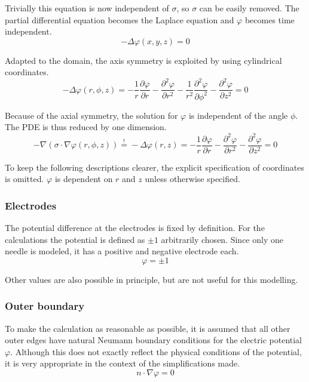\documentclass[parskip=half, titlepage=yes, 12pt, BCOR=12mm, DIV=calc]{scrartcl}
\begin{document}
Trivially this equation is now independent of $\sigma$, so $\sigma$ can be easily removed. The partial differential equation becomes the Laplace equation and $\varphi$ becomes time independent.
\begin{equation}
    - \Delta \varphi(x,y,z) = 0
\end{equation}

Adapted to the domain, the axis symmetry is exploited by using cylindrical coordinates.
\begin{equation}
    - \Delta \varphi(r,\phi,z) = - \frac{1}{r} \frac{\partial \varphi}{\partial r} - \frac{\partial^2 \varphi}{\partial r^2} - \frac{1}{r^2} \frac{\partial^2 \varphi}{\partial \phi^2} -      \frac{\partial^2 \varphi}{\partial z^2}  = 0
\end{equation}

Because of the axial symmetry, the solution for $\varphi$ is independent of the angle $\phi$. The PDE is thus reduced by one dimension. 
\begin{equation}
    - \nabla  ( \sigma \cdot \nabla \varphi(r,\phi,z)) \overset{!}{=} - \Delta \varphi(r,z) = - \frac{1}{r} \frac{\partial \varphi}{\partial r} - \frac{\partial^2 \varphi}{\partial r^2} - \frac{\partial^2 \varphi}{\partial z^2} = 0
\end{equation}

To keep the following descriptions clearer, the explicit specification of coordinates is omitted. $\varphi$ is dependent on $r$ and $z$ unless otherwise specified.

\subsubsection{Electrodes}

The potential difference at the electrodes is fixed by definition. For the calculations the potential is defined as $\pm 1$ arbitrarily chosen. Since only one needle is modeled, it has a positive and negative electrode each.
\begin{equation}
    \varphi = \pm 1
\end{equation}

Other values are also possible in principle, but are not useful for this modelling.

\subsubsection{Outer boundary}

To make the calculation as reasonable as possible, it is assumed that all other outer edges have natural Neumann boundary conditions for the electric potential $\varphi$. Although this does not exactly reflect the physical conditions of the potential, it is very appropriate in the context of the simplifications made.
\begin{equation}
    n \cdot \nabla \varphi = 0
\end{equation}
\end{document}
